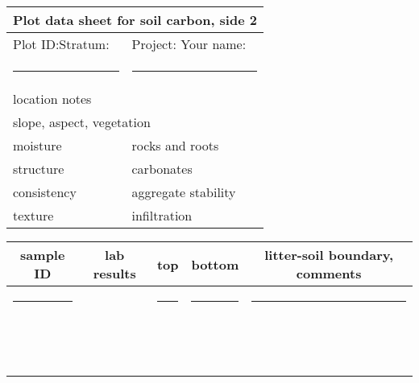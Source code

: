 \documentclass[11pt,letterpaper,oneside,onecolumn]{memoir}
\begin{document}
\clearpage
\small  {}
\begin{center}
\begin{tabular}{|l|l|}
\multicolumn{2}{c}{\textbf{Plot data sheet for soil carbon, side 2}}\\
\hline
Plot ID:\hspace{4em}Stratum: &Project: \hspace{3em}  Your name:\\
\rule[0in]{3.12in}{0in}&\rule[0in]{3.12in}{0in}\\
\hline \hline

\multicolumn{2}{|l|}{\rule[-10mm]{0mm}{10mm}location notes}\\ \hline
\multicolumn{2}{|l|}{\rule[-8mm]{0mm}{8mm}slope, aspect, vegetation}\\ \hline
\rule[-8mm]{0mm}{8mm}moisture&\rule[-8mm]{0mm}{8mm}rocks and roots\\ \hline
\rule[-8mm]{0mm}{8mm}structure&\rule[-8mm]{0mm}{8mm}carbonates\\ \hline
\rule[-8mm]{0mm}{8mm}consistency&\rule[-8mm]{0mm}{8mm}aggregate stability\\ \hline
\rule[-8mm]{0mm}{8mm}texture&\rule[-8mm]{0mm}{8mm}infiltration\\ \hline
\end{tabular}

\vspace{.6em}

\begin{tabular}{|c||c||c|c||c|}\hline
sample ID&lab results&top&bottom&litter-soil boundary, comments\\ \hline
\rule[0mm]{0mm}{8mm} \rule[0in]{.9in}{0in}&&\rule[0in]{.5in}{0in}&\rule[0in]{.5in}{0in}&\rule[0in]{3in}{0in}\\ \hline
\rule[0mm]{0mm}{8mm}& & & & \\ \hline
\rule[0mm]{0mm}{8mm}& & & & \\ \hline
\rule[0mm]{0mm}{8mm}& & & & \\ \hline
\rule[0mm]{0mm}{8mm}& & & & \\ \hline
\rule[0mm]{0mm}{8mm}& & & & \\ \hline
\rule[0mm]{0mm}{8mm}& & & & \\ \hline
\rule[0mm]{0mm}{8mm}& & & & \\ \hline
\rule[0mm]{0mm}{8mm}& & & & \\ \hline
\rule[0mm]{0mm}{8mm}& & & & \\ \hline
\rule[0mm]{0mm}{8mm}& & & & \\ \hline
\rule[0mm]{0mm}{8mm}& & & & \\ \hline
\rule[0mm]{0mm}{8mm}& & & & \\ \hline

\end{tabular}
\end{center}
\normalsize
\end{document}
